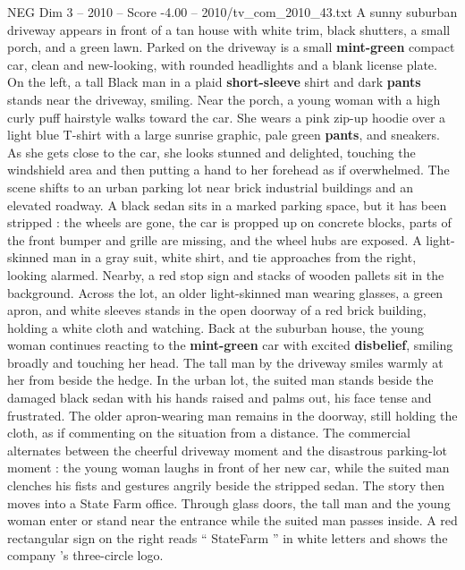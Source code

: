 \begin{textsample}{NEG Dim 3 – 2010 – Score -4.00 – 2010/tv\_com\_2010\_43.txt}  \label{ex:f3_neg_001}
A sunny suburban driveway appears in front of a tan house with white trim, black shutters, a small porch, and a green lawn.
Parked on the driveway is a small \textbf{mint-green} compact car, clean and new-looking, with rounded headlights and a blank license plate.
On the left, a tall Black man in a plaid \textbf{short-sleeve} shirt and dark \textbf{pants} stands near the driveway, smiling.
Near the porch, a young woman with a high curly puff hairstyle walks toward the car.
She wears a pink zip-up hoodie over a light blue T-shirt with a large sunrise graphic, pale green \textbf{pants}, and sneakers.
As she gets close to the car, she looks stunned and delighted, touching the windshield area and then putting a hand to her forehead as if overwhelmed.
The scene shifts to an urban parking lot near brick industrial buildings and an elevated roadway.
A black sedan sits in a marked parking space, but it has been stripped : the wheels are gone, the car is propped up on concrete blocks, parts of the front bumper and grille are missing, and the wheel hubs are exposed.
A light-skinned man in a gray suit, white shirt, and tie approaches from the right, looking alarmed.
Nearby, a red stop sign and stacks of wooden pallets sit in the background.
Across the lot, an older light-skinned man wearing glasses, a green apron, and white sleeves stands in the open doorway of a red brick building, holding a white cloth and watching.
Back at the suburban house, the young woman continues reacting to the \textbf{mint-green} car with excited \textbf{disbelief}, smiling broadly and touching her head.
The tall man by the driveway smiles warmly at her from beside the hedge.
In the urban lot, the suited man stands beside the damaged black sedan with his hands raised and palms out, his face tense and frustrated.
The older apron-wearing man remains in the doorway, still holding the cloth, as if commenting on the situation from a distance.
The commercial alternates between the cheerful driveway moment and the disastrous parking-lot moment : the young woman laughs in front of her new car, while the suited man clenches his fists and gestures angrily beside the stripped sedan.
The story then moves into a State Farm office.
Through glass doors, the tall man and the young woman enter or stand near the entrance while the suited man passes inside.
A red rectangular sign on the right reads “ StateFarm ” in white letters and shows the company ’s three-circle logo.

\end{textsample}
